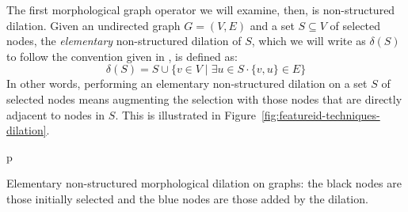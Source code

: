 The first morphological graph operator we will examine, then, is non-structured dilation. Given an undirected graph $G = (V,E)$ and a set $S \subseteq V$ of selected nodes, the \emph{elementary} non-structured dilation of $S$, which we will write as $\delta(S)$ to follow the convention given in \cite{heijmans92a}, is defined as:
%
\[
\delta(S) = S \cup \{v \in V \; | \; \exists u \in S \cdot \{v,u\} \in E\}
\]
%
In other words, performing an elementary non-structured dilation on a set $S$ of selected nodes means augmenting the selection with those nodes that are directly adjacent to nodes in $S$. This is illustrated in Figure~\ref{fig:featureid-techniques-dilation}.

\begin{stusubfig}{p}
	\hspace{12mm}%
\caption[Elementary non-structured morphological dilation on graphs]{Elementary non-structured morphological dilation on graphs: the black nodes are those initially selected and the blue nodes are those added by the dilation.}
\label{fig:featureid-techniques-dilation}
\end{stusubfig}

